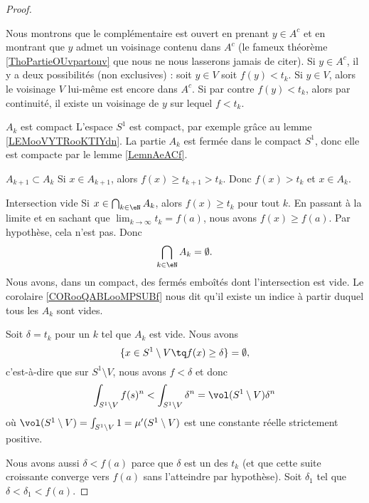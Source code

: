 \begin{proof}
\begin{subproof}
        Nous montrons que le complémentaire est ouvert en prenant \( y\in A^c\) et en montrant que \( y\) admet un voisinage contenu dans \( A^c\) (le fameux théorème \ref{ThoPartieOUvpartouv} que nous ne nous lasserons jamais de citer). Si \( y\in A^c\), il y a deux possibilités (non exclusives) : soit \( y\in V\) soit \( f(y)<t_k\). Si \( y\in V\), alors le voisinage \( V\) lui-même est encore dans \( A^c\). Si par contre \( f(y)<t_k\), alors par continuité, il existe un voisinage de \( y\) sur lequel \( f<t_k\).
    \item[\( A_k\) est compact]
        L'espace \( S^1\) est compact, par exemple grâce au lemme \ref{LEMooVYTRooKTIYdn}. La partie \( A_k\) est fermée dans le compact \( S^1\), donc elle est compacte par le lemme \ref{LemnAeACf}.
    \item[\( A_{k+1}\subset A_k\)]
        Si \( x\in A_{k+1}\), alors \( f(x)\geq t_{k+1}>t_k\). Donc \( f(x)>t_k\) et \( x\in A_k\).
    \item[Intersection vide]
        Si \( x\in\bigcap_{k\in \eN}A_k\), alors \( f(x)\geq t_k\) pour tout \( k\). En passant à la limite et en sachant que \( \lim_{k\to \infty} t_k=f(a)\), nous avons \( f(x)\geq f(a)\). Par hypothèse, cela n'est pas. Donc
        \begin{equation}
            \bigcap_{k\in \eN}A_k=\emptyset.
        \end{equation}
        Nous avons, dans un compact, des fermés emboîtés dont l'intersection est vide. Le corolaire \ref{CORooQABLooMPSUBf} nous dit qu'il existe un indice à partir duquel tous les \( A_k\) sont vides.
    \end{subproof}
    
    Soit \( \delta=t_k\) pour un \( k\) tel que \( A_k\) est vide. Nous avons
    \begin{equation}
        \{ x\in S^1\setminus V\tq f(x)\geq \delta \}=\emptyset,
    \end{equation}
    c'est-à-dire que sur \( S^1\setminus V\), nous avons \( f<\delta\) et donc
    \begin{equation}
        \int_{S^1\setminus V}f(s)^n<\int_{S^1\setminus V}\delta^n=\vol(S^1\setminus V)\delta^n
    \end{equation}
    où \( \vol(S^1\setminus V)=\int_{S^1\setminus V}1=\mu'(S^1\setminus V)\) est une constante réelle strictement positive.

    Nous avons aussi \( \delta<f(a)\) parce que \( \delta\) est un des \( t_k\) (et que cette suite croissante converge vers \( f(a)\) sans l'atteindre par hypothèse). Soit \( \delta_1\) tel que \( \delta<\delta_1<f(a)\).


\end{proof}
